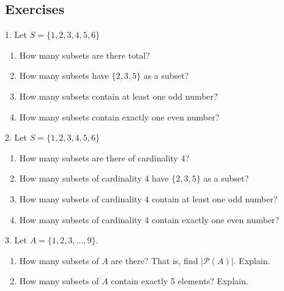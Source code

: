 \documentclass[10pt,]{book}
\theoremstyle{plain}
\theoremstyle{definition}
\numberwithin{equation}{chapter}
\def\pow{\mathcal P}
\begin{document}
\subsection[Exercises]{Exercises}\label{exercises_counting-binom}
\begin{exerciselist}
\item[1.]\hypertarget{exercise-56}{}
            Let \(S = \{1, 2, 3, 4, 5, 6\}\)
          \leavevmode%
\begin{enumerate}[label=(\alph*)]
\item\hypertarget{li-214}{} How many subsets are there total? %
\item\hypertarget{li-215}{} How many subsets have \(\{2,3,5\}\) as a subset? %
\item\hypertarget{li-216}{} How many subsets contain at least one odd number? %
\item\hypertarget{li-217}{} How many subsets contain exactly one even number? %
\end{enumerate}

\par\smallskip
\item[2.]\hypertarget{exercise-57}{}
            Let \(S = \{1, 2, 3, 4, 5, 6\}\)
          \leavevmode%
\begin{enumerate}[label=(\alph*)]
\item\hypertarget{li-222}{} How many subsets are there of cardinality 4? %
\item\hypertarget{li-223}{} How many subsets of cardinality 4 have \(\{2,3,5\}\) as a subset? %
\item\hypertarget{li-224}{} How many subsets of cardinality 4 contain at least one odd number? %
\item\hypertarget{li-225}{} How many subsets of cardinality 4 contain exactly one even number? %
\end{enumerate}

\par\smallskip
\item[3.]\hypertarget{exercise-58}{}
            Let \(A = \{1,2,3,\ldots,9\}\).
          \leavevmode%
\begin{enumerate}[label=(\alph*)]
\item\hypertarget{li-230}{}
                How many subsets of \(A\) are there? That is, find \(|\pow(A)|\). Explain.


\item\hypertarget{li-231}{}
                How many subsets of \(A\) contain exactly 5 elements? Explain.



\end{enumerate}
\end{exerciselist}
\end{document}
